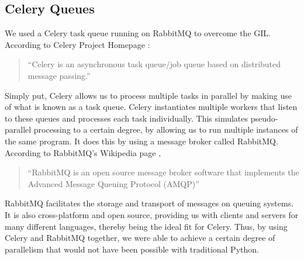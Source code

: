 \subsection{Celery Queues}
\label{exp:Celery}
We used a Celery task queue running on RabbitMQ to overcome the GIL. According to Celery Project Homepage \cite{Celery}:
\begin{quotation}
``Celery is an asynchronous task queue/job queue based on distributed message passing.''
\end{quotation}

Simply put, Celery allows us to process multiple tasks in parallel by making use of what is known as a task queue. Celery instantiates multiple workers that listen to these queues and processes each task individually. This simulates pseudo-parallel processing to a certain degree, by allowing us to run multiple instances of the same program. It does this by using a message broker called RabbitMQ.
According to RabbitMQ's Wikipedia page \cite{wiki:RabbitMQ},
\begin{quotation}
``RabbitMQ is an open source message broker software that implements the Advanced Message Queuing Protocol (AMQP)''
\end{quotation}
RabbitMQ facilitates the storage and transport of messages on queuing systems. It is also cross-platform and open source, providing us with clients and servers for many different languages, thereby being the ideal fit for Celery.
Thus, by using Celery and RabbitMQ together, we were able to achieve a certain degree of parallelism that would not have been possible with traditional Python.

